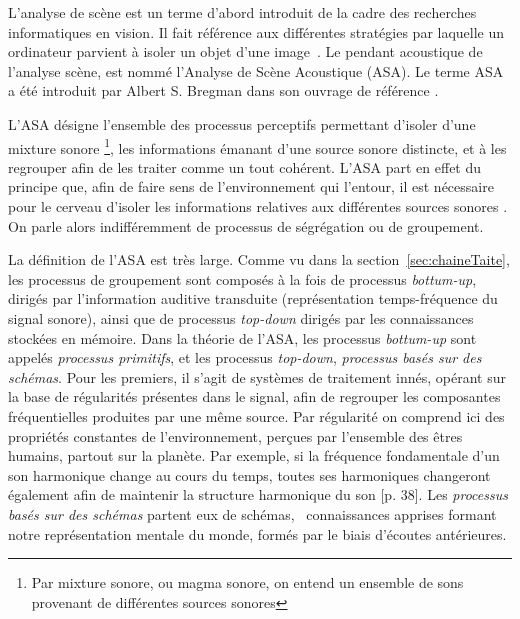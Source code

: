 L'analyse de scène est un terme d'abord introduit de la cadre des recherches informatiques en vision. Il fait référence aux différentes stratégies par laquelle un ordinateur parvient à isoler un objet d'une image~\citep[p. 12]{mcadams1994penser}. Le pendant acoustique de l'analyse scène, est nommé l'Analyse de Scène Acoustique (ASA). Le terme ASA a été introduit par Albert S. Bregman dans son ouvrage de référence \citep{bregman1994auditory}.  

L'ASA désigne l'ensemble des processus perceptifs permettant d'isoler d'une mixture sonore \footnote{Par mixture sonore, ou magma sonore, on entend un ensemble de sons provenant de différentes sources sonores}, les informations émanant d'une source sonore distincte, et à les regrouper afin de les traiter comme un tout cohérent.  L'ASA part en effet du principe que, afin de faire sens de l'environnement qui l'entour, il est nécessaire pour le cerveau d'isoler les informations relatives aux différentes sources sonores \citep{winkler2009modeling}. On parle alors indifféremment de processus de ségrégation ou de groupement.

La définition de l'ASA est très large. Comme vu dans la section~\ref{sec:chaineTaite}, les processus de groupement sont composés à la fois de processus \emph{bottum-up}, \ie~ dirigés par l'information auditive transduite (représentation temps-fréquence du signal sonore), ainsi que de processus \emph{top-down} dirigés par les connaissances stockées en mémoire. Dans la théorie de l'ASA, les processus \emph{bottum-up} sont appelés \emph{processus primitifs}, et les processus  \emph{top-down}, \emph{processus basés sur des schémas}.
Pour les premiers, il s'agit de systèmes de traitement innés, opérant sur la base de régularités présentes dans le signal, afin de regrouper les composantes fréquentielles produites par une même source. Par régularité on comprend ici des propriétés constantes de l'environnement, perçues par l'ensemble des êtres humains, partout sur la planète. Par exemple, si la fréquence fondamentale d'un son harmonique change au cours du temps, toutes ses harmoniques changeront également afin de maintenir la structure harmonique du son [p. 38]\citep{bregman1994auditory}. Les \emph{processus basés sur des schémas}  partent eux de schémas, \ie~connaissances apprises formant notre représentation mentale du monde, formés par le biais d'écoutes antérieures.

